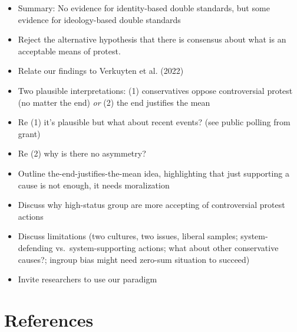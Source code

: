 \documentclass[twocolumn, 11pt, letterpaper]{article}
\newcommand{\refsection}{\section{References}}
\providecommand{\tightlist}{\setlength{\itemsep}{0pt}\setlength{\parskip}{0pt}}
\begin{document}
\begin{itemize}
\tightlist
\item
  Summary: No evidence for identity-based double standards, but some
  evidence for ideology-based double standards
\item
  Reject the alternative hypothesis that there is consensus about what
  is an acceptable means of protest.
\item
  Relate our findings to Verkuyten et al. (2022)
\item
  Two plausible interpretations: (1) conservatives oppose controversial
  protest (no matter the end) \emph{or} (2) the end justifies the mean
\item
  Re (1) it's plausible but what about recent events? (see public
  polling from grant)
\item
  Re (2) why is there no asymmetry?
\item
  Outline the-end-justifies-the-mean idea, highlighting that just
  supporting a cause is not enough, it needs moralization
\item
  Discuss why high-status group are more accepting of controversial
  protest actions
\item
  Discuss limitations (two cultures, two issues, liberal samples;
  system-defending vs.~system-supporting actions; what about other
  conservative causes?; ingroup bias might need zero-sum situation to
  succeed)
\item
  Invite researchers to use our paradigm
\end{itemize}

\refsection

\begingroup

\noindent \setlength{\parindent}{-0.5in} \setlength{\leftskip}{0.5in}
\small
\end{document}
